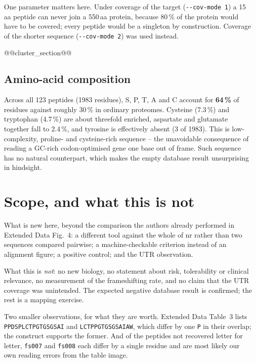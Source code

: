\documentclass[11pt,a4paper]{article}
\begin{document}
One parameter matters here. Under coverage of the target
(\texttt{-{}-cov-mode 1}) a 15\,aa peptide can never join a 550\,aa protein,
because 80\,\% of the protein would have to be covered; every peptide would be
a singleton by construction. Coverage of the shorter sequence
(\texttt{-{}-cov-mode 2}) was used instead.

@@cluster_section@@

\subsection{Amino-acid composition}

Across all 123 peptides (1983 residues), S, P, T, A and C account for
\textbf{64\,\%} of residues against roughly 30\,\% in ordinary proteomes.
Cysteine (7.3\,\%) and tryptophan (4.7\,\%) are about threefold enriched,
aspartate and glutamate together fall to 2.4\,\%, and tyrosine is effectively
absent (3 of 1983). This is low-complexity, proline- and cysteine-rich
sequence -- the unavoidable consequence of reading a GC-rich codon-optimised
gene one base out of frame. Such sequence has no natural counterpart, which
makes the empty database result unsurprising in hindsight.

\section{Scope, and what this is not}

What is new here, beyond the comparison the authors already performed in
Extended Data Fig.~4: a different tool against the whole of nr rather than two
sequences compared pairwise; a machine-checkable criterion instead of an
alignment figure; a positive control; and the UTR observation.

What this is \emph{not}: no new biology, no statement about risk,
tolerability or clinical relevance, no measurement of the frameshifting rate,
and no claim that the UTR coverage was unintended. The expected negative
database result is confirmed; the rest is a mapping exercise.

Two smaller observations, for what they are worth. Extended Data Table~3 lists
\texttt{PPDSPLCTPGTGSGSAI} and \texttt{LCTPPGTGSGSAIAW}, which differ by one
\texttt{P} in their overlap; the construct supports the former. And of the
peptides not recovered letter for letter, \texttt{fs007} and \texttt{fs008}
each differ by a single residue and are most likely our own reading errors
from the table image.
\end{document}
